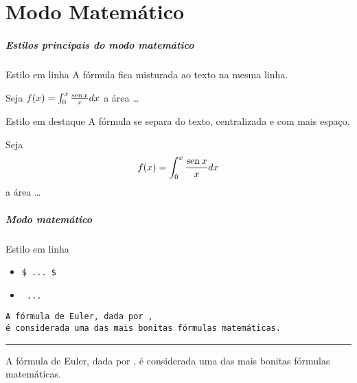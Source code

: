 
\part{Modo Matemático}


\begin{frame}
  \frametitle{Estilos principais do modo matemático}
 
  \begin{block}{Estilo em linha}%
    A fórmula fica misturada ao texto na mesma linha.
  \end{block}
    \begin{exemplo}[]
      Seja $f(x) =\int_0^x \frac{\operatorname{sen} x}{x} dx$ a área \dots
    \end{exemplo}
    
    \medskip


  \begin{block}{Estilo em destaque}%
    A fórmula se separa do texto, centralizada e com mais espaço.
  \end{block}
  \begin{exemplo}
    Seja
    \[
    f(x) =\int_0^x \frac{\operatorname{sen} x}{x} dx
    \] a área \dots
  \end{exemplo}
  


\end{frame}


\begin{frame}
  \frametitle{Modo matemático}

  \begin{block}{Estilo em linha}

    \begin{itemize}
    \item \texttt{\blue\$ ...\ \blue\$}
    \item \texttt{\blue{\string\(} ...\ \blue{\string\)}}
    \end{itemize}

  \end{block}

    \begin{exemplo}
        \texttt{A fórmula de Euler, dada por ,\\ é considerada uma das
          mais bonitas fórmulas matemáticas.}

        \bigskip\hrule\bigskip

        A fórmula de Euler, dada por , é considerada uma das
          mais bonitas fórmulas matemáticas.
    \end{exemplo}
\end{frame}

